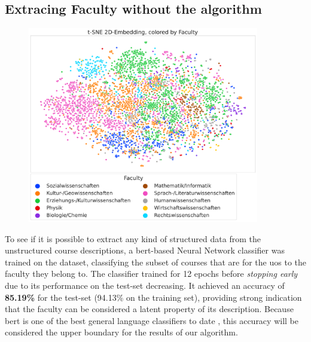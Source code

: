 \subsection*{Extracing Faculty without the algorithm}

\begin{figure}[h]
	\begin{center}
	  \includegraphics[width=0.9\textwidth]{graphics/dataset_new/scatter_mds_tsne_e2a70a9bf2.pdf}
	  \label{fig:scatter_mds_siddata}
	\end{center}
\end{figure}

To see if it is possible to extract any kind of structured data from the unstructured course descriptions, a \gls{bert}-based Neural Network classifier was trained on the dataset, classifying the subset of courses that are for the \gls{uos} to the faculty they belong to. The classifier trained for 12 epochs before \emph{stopping early} due to its performance on the test-set decreasing. It achieved an accuracy of \textbf{85.19\%} for the test-set (94.13\% on the training set), providing strong indication that the faculty can be considered a latent property of its description. Because \gls{bert} is one of the best general language classifiers to date \cite{Devlin2019}, this accuracy will be considered the upper boundary for the results of our algorithm.

